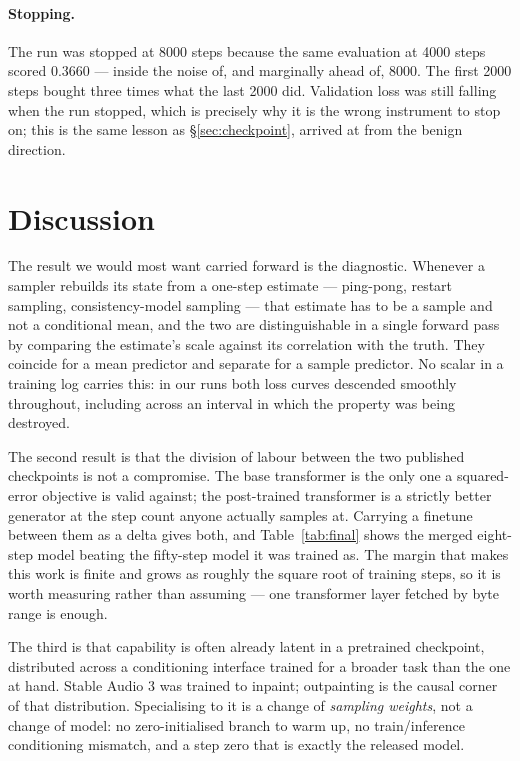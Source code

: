 \documentclass[10pt,twocolumn,letterpaper]{article}
\begin{document}
\paragraph{Stopping.} The run was stopped at 8000 steps because the same
evaluation at 4000 steps scored $0.3660$ --- inside the noise of, and marginally
ahead of, 8000. The first 2000 steps bought three times what the last 2000 did.
Validation loss was still falling when the run stopped, which is precisely why it
is the wrong instrument to stop on; this is the same lesson as
\S\ref{sec:checkpoint}, arrived at from the benign direction.

\section{Discussion}

The result we would most want carried forward is the diagnostic. Whenever a
sampler rebuilds its state from a one-step estimate --- ping-pong, restart
sampling, consistency-model sampling --- that estimate has to be a sample and not
a conditional mean, and the two are distinguishable in a single forward pass by
comparing the estimate's scale against its correlation with the truth. They
coincide for a mean predictor and separate for a sample predictor. No scalar in a
training log carries this: in our runs both loss curves descended smoothly
throughout, including across an interval in which the property was being
destroyed.

The second result is that the division of labour between the two published
checkpoints is not a compromise. The base transformer is the only one a
squared-error objective is valid against; the post-trained transformer is a
strictly better generator at the step count anyone actually samples at. Carrying
a finetune between them as a delta gives both, and
Table~\ref{tab:final} shows the merged eight-step model beating the fifty-step
model it was trained as. The margin that makes this work is finite and grows as
roughly the square root of training steps, so it is worth measuring rather than
assuming --- one transformer layer fetched by byte range is enough.

The third is that capability is often already latent in a pretrained checkpoint,
distributed across a conditioning interface trained for a broader task than the
one at hand. Stable Audio 3 was trained to inpaint; outpainting is the causal
corner of that distribution. Specialising to it is a change of \emph{sampling
weights}, not a change of model: no zero-initialised branch to warm up, no
train/inference conditioning mismatch, and a step zero that is exactly the
released model.
\end{document}
